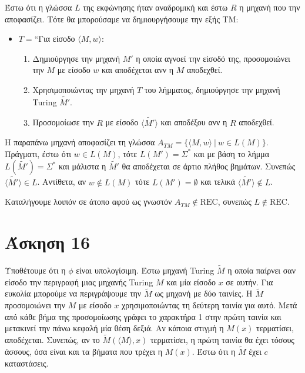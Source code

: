 \documentclass[a4paper, oneside, 11pt]{article}
\theoremstyle{definition}
\begin{document}
Έστω ότι η γλώσσα $L$ της εκφώνησης ήταν αναδρομική και έστω $R$ η μηχανή που την
αποφασίζει. Τότε θα μπορούσαμε να δημιουργήσουμε την εξής TM:

\begin{itemize}
\item $T = $``Για είσοδο $\langle M, w \rangle$:
      \begin{enumerate}
      \item Δημιούργησε την μηχανή $M'$ η οποία αγνοεί την είσοδό της,
      προσομοιώνει την $M $ με είσοδο $w$ και αποδέχεται
      ανν η $M$ αποδεχθεί.
      \item Χρησιμοποιώντας την μηχανή $T$ του λήμματος, δημιούργησε την μηχανή
      Turing $\widetilde{M'}$.
      \item Προσομοίωσε την $R$ με είσοδο $\langle \widetilde{M'} \rangle$
      και αποδέξου ανν η $R$ αποδεχθεί.
      \end{enumerate}
\end{itemize}

Η παραπάνω μηχανή αποφασίζει τη γλώσσα $A_{TM} = \{ \langle M, w \rangle\ |\ w \in
L(M) \}$. Πράγματι, έστω ότι $w \in L(M)$, τότε $L(M') = \Sigma^*$ και με βάση το
λήμμα $L(\widetilde{M'}) = \Sigma^*$ και μάλιστα η $\widetilde{M'}$ θα αποδέχεται
σε άρτιο πλήθος βημάτων. Συνεπώς $\langle \widetilde{M'} \rangle \in L$. Αντίθετα, αν
$w \notin L(M)$ τότε $L(M') = \emptyset$ και τελικά $\langle \widetilde{M'} \rangle
\notin L$.

Καταλήγουμε λοιπόν σε άτοπο αφού ως γνωστόν $A_{TM} \notin \text{REC}$, συνεπώς
$L \notin \text{REC}$.
\section*{Άσκηση 16}

Υποθέτουμε ότι η $\phi$ είναι υπολογίσιμη.
Έστω μηχανή Turing $\widetilde{M}$ η οποία παίρνει σαν είσοδο την περιγραφή μιας μηχανής Turing $M$ και μία
είσοδο $x$ σε αυτήν. 
Για ευκολία μπορούμε να περιγράψουμε την $\widetilde{M}$ ως μηχανή με δύο ταινίες. 
Η $\widetilde{M}$ προσομοιώνει την $M$ με είσοδο $x$ χρησιμοποιώντας τη δεύτερη ταινία για αυτό. 
Μετά από κάθε βήμα της προσομοίωσης γράφει το χαρακτήρα 1 στην πρώτη ταινία και μετακινεί την πάνω κεφαλή 
μία θέση δεξιά. Αν κάποια στιγμή η $M(x)$ τερματίσει, αποδέχεται. Συνεπώς, αν το $\widetilde{M}(\langle M\rangle,x)$ 
τερματίσει, 
η πρώτη ταινία θα έχει τόσους άσσους, όσα είναι και τα βήματα που τρέχει η $M(x)$. Έστω ότι η $\widetilde{M}$
έχει $c$ καταστάσεις.
\end{document}
